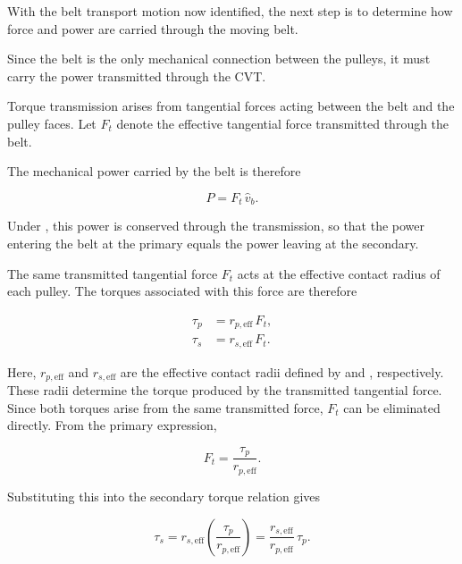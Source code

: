 \documentclass[11pt]{article}
\numberwithin{equation}{section}
\newcounter{assump}
\begin{document}
With the belt transport motion now identified, the next step is to determine
how force and power are carried through the moving belt.

Since the belt is the only mechanical connection between the pulleys, it must
carry the power transmitted through the CVT.

Torque transmission arises from tangential forces acting between the belt and
the pulley faces. Let \(F_t\) denote the effective tangential force transmitted
through the belt.

The mechanical power carried by the belt is therefore

\begin{equation}
P = F_t \,\hat{v}_b.
\label{eq:belt_power}
\end{equation}

Under , this power is conserved through the
transmission, so that the power entering the belt at the primary equals the
power leaving at the secondary.

The same transmitted tangential force \(F_t\) acts at the effective contact
radius of each pulley. The torques associated with this force are therefore

\begin{align}
\tau_p &= r_{p,\mathrm{eff}} \, F_t, \\
\tau_s &= r_{s,\mathrm{eff}} \, F_t.
\label{eq:torques_from_Ft}
\end{align}

Here, \(r_{p,\mathrm{eff}}\) and \(r_{s,\mathrm{eff}}\) are the effective
contact radii defined by  and
, respectively. These radii determine the torque produced
by the transmitted tangential force.
Since both torques arise from the same transmitted force, \(F_t\) can be
eliminated directly. From the primary expression,

\begin{equation}
F_t = \frac{\tau_p}{r_{p,\mathrm{eff}}}.
\label{eq:Ft_from_taup}
\end{equation}

Substituting this into the secondary torque relation gives

\begin{equation}
\tau_s
=
r_{s,\mathrm{eff}}
\left(
\frac{\tau_p}{r_{p,\mathrm{eff}}}
\right)
=
\frac{r_{s,\mathrm{eff}}}{r_{p,\mathrm{eff}}}\,\tau_p.
\label{eq:taus_from_taup_intermediate}
\end{equation}
\end{document}
